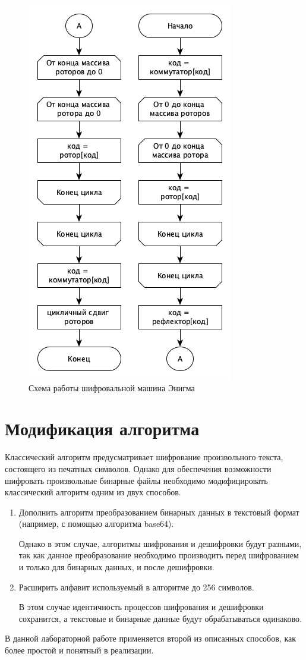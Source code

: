 \begin{figure}[ht!]
	\centering
	\includegraphics[width=0.6\linewidth]{img/graphs/enigma-algo.png}
	\caption{Схема работы шифровальной машина Энигма}
	\label{fig:alg}
\end{figure}

\section{Модификация алгоритма}

Классический алгоритм предусматривает шифрование произвольного текста, состоящего из печатных символов.
Однако для обеспечения возможности шифровать произвольные бинарные файлы необходимо модифицировать классический алгоритм одним из двух способов.

\begin{enumerate}
    \item Дополнить алгоритм преобразованием бинарных данных в текстовый формат (например, с помощью алгоритма base64).
    
    Однако в этом случае, алгоритмы шифрования и дешифровки будут разными, так как данное преобразование необходимо производить перед шифрованием и только для бинарных данных, и после дешифровки.

    \item Расширить алфавит используемый в алгоритме до 256 символов.
    
    В этом случае идентичность процессов шифрования и дешифровки сохранится, а текстовые и бинарные данные будут обрабатываться одинаково.
\end{enumerate}

В данной лабораторной работе применяется второй из описанных способов, как более простой и понятный в реализации.

\clearpage
